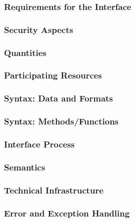 \subsubsection{Requirements for the Interface}

\subsubsection{Security Aspects}

\subsubsection{Quantities}

\subsubsection{Participating Resources}
% 

\subsubsection{Syntax: Data and Formats}

\subsubsection{Syntax: Methods/Functions}

\subsubsection{Interface Process}

\subsubsection{Semantics}

\subsubsection{Technical Infrastructure}

\subsubsection{Error and Exception Handling}
% 

